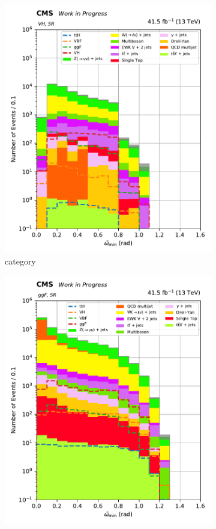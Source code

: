 \begin{figure}[htbp]
\begin{subfigure}[b]{0.27\textwidth}
        \includegraphics[width=\textwidth]{figures/category_optimisations/min_omega_tilde_VH.pdf}
        \caption{\VH category}
    \end{subfigure}
    \hfill
    \begin{subfigure}[b]{0.27\textwidth}
        \includegraphics[width=\textwidth]{figures/category_optimisations/min_omega_tilde_ggF.pdf}

\end{subfigure}
\end{figure}
